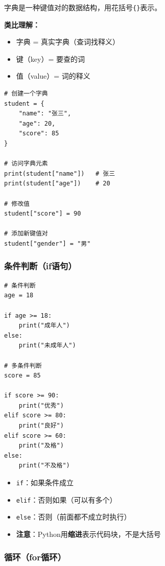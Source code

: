 \documentclass[12pt,a4paper]{article}
\begin{document}
\begin{knowledgebox}
字典是一种键值对的数据结构，用花括号\texttt{\{\}}表示。

\textbf{类比理解：}
\begin{itemize}
    \item 字典 = 真实字典（查词找释义）
    \item 键（key）= 要查的词
    \item 值（value）= 词的释义
\end{itemize}
\end{knowledgebox}

\begin{lstlisting}[caption={字典示例}]
# 创建一个字典
student = {
    "name": "张三",
    "age": 20,
    "score": 85
}

# 访问字典元素
print(student["name"])   # 张三
print(student["age"])    # 20

# 修改值
student["score"] = 90

# 添加新键值对
student["gender"] = "男"
\end{lstlisting}

\subsubsection{条件判断（if语句）}

\begin{lstlisting}[caption={条件判断示例}]
# 条件判断
age = 18

if age >= 18:
    print("成年人")
else:
    print("未成年人")

# 多条件判断
score = 85

if score >= 90:
    print("优秀")
elif score >= 80:
    print("良好")
elif score >= 60:
    print("及格")
else:
    print("不及格")
\end{lstlisting}

\begin{knowledgebox}
\begin{itemize}
    \item \texttt{if}：如果条件成立
    \item \texttt{elif}：否则如果（可以有多个）
    \item \texttt{else}：否则（前面都不成立时执行）
    \item \textbf{注意}：Python用\textbf{缩进}表示代码块，不是大括号
\end{itemize}
\end{knowledgebox}

\subsubsection{循环（for循环）}
\end{document}
